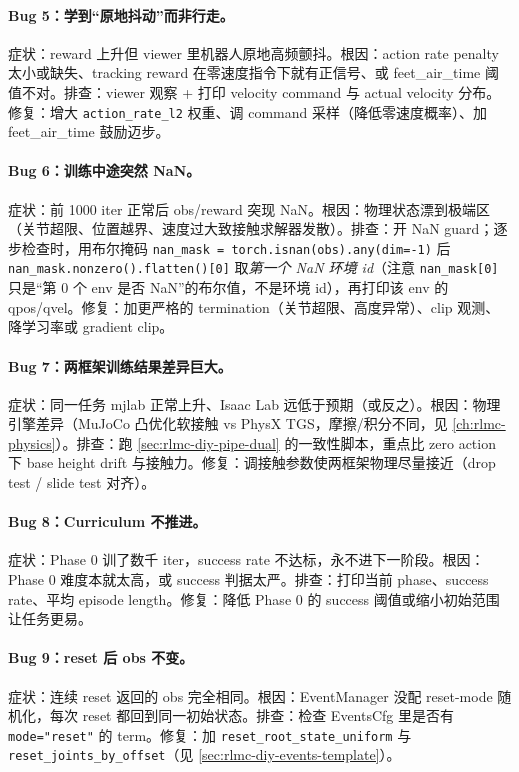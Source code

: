 \paragraph{Bug 5：学到“原地抖动”而非行走。}症状：reward 上升但 viewer 里机器人原地高频颤抖。根因：action rate penalty 太小或缺失、tracking reward 在零速度指令下就有正信号、或 feet\_air\_time 阈值不对。排查：viewer 观察 + 打印 velocity command 与 actual velocity 分布。修复：增大 \verb|action_rate_l2| 权重、调 command 采样（降低零速度概率）、加 feet\_air\_time 鼓励迈步。

\paragraph{Bug 6：训练中途突然 NaN。}症状：前 1000 iter 正常后 obs/reward 突现 NaN。根因：物理状态漂到极端区（关节超限、位置越界、速度过大致接触求解器发散）。排查：开 NaN guard；逐步检查时，用布尔掩码 \verb|nan_mask = torch.isnan(obs).any(dim=-1)| 后 \verb|nan_mask.nonzero().flatten()[0]| 取\emph{第一个 NaN 环境 id}（注意 \verb|nan_mask[0]| 只是“第 0 个 env 是否 NaN”的布尔值，不是环境 id），再打印该 env 的 qpos/qvel。修复：加更严格的 termination（关节超限、高度异常）、clip 观测、降学习率或 gradient clip。

\paragraph{Bug 7：两框架训练结果差异巨大。}症状：同一任务 mjlab 正常上升、Isaac Lab 远低于预期（或反之）。根因：物理引擎差异（MuJoCo 凸优化软接触 vs PhysX TGS，摩擦/积分不同，见 \cref{ch:rlmc-physics}）。排查：跑 \cref{sec:rlmc-diy-pipe-dual} 的一致性脚本，重点比 zero action 下 base height drift 与接触力。修复：调接触参数使两框架物理尽量接近（drop test / slide test 对齐）。

\paragraph{Bug 8：Curriculum 不推进。}症状：Phase 0 训了数千 iter，success rate 不达标，永不进下一阶段。根因：Phase 0 难度本就太高，或 success 判据太严。排查：打印当前 phase、success rate、平均 episode length。修复：降低 Phase 0 的 success 阈值或缩小初始范围让任务更易。

\paragraph{Bug 9：reset 后 obs 不变。}症状：连续 reset 返回的 obs 完全相同。根因：EventManager 没配 reset-mode 随机化，每次 reset 都回到同一初始状态。排查：检查 EventsCfg 里是否有 \verb|mode="reset"| 的 term。修复：加 \verb|reset_root_state_uniform| 与 \verb|reset_joints_by_offset|（见 \cref{sec:rlmc-diy-events-template}）。

